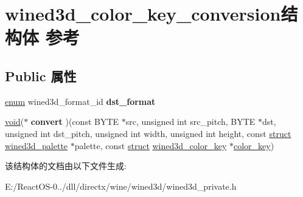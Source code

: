 \hypertarget{structwined3d__color__key__conversion}{}\section{wined3d\+\_\+color\+\_\+key\+\_\+conversion结构体 参考}
\label{structwined3d__color__key__conversion}
\subsection*{Public 属性}
\begin{DoxyCompactItemize}
\item 
\mbox{\label{structwined3d__color__key__conversion_a3f2db482c1bf63bac8eee63b75c5b903}} 
\hyperlink{interfaceenum}{enum} wined3d\+\_\+format\+\_\+id {\bfseries dst\+\_\+format}
\item 
\mbox{\label{structwined3d__color__key__conversion_a1e7419b01166eece309c4b51062fb1e2}} 
\hyperlink{interfacevoid}{void}($\ast$ {\bfseries convert} )(const B\+Y\+TE $\ast$src, unsigned int src\+\_\+pitch, B\+Y\+TE $\ast$dst, unsigned int dst\+\_\+pitch, unsigned int width, unsigned int height, const \hyperlink{interfacestruct}{struct} \hyperlink{structwined3d__palette}{wined3d\+\_\+palette} $\ast$palette, const \hyperlink{interfacestruct}{struct} \hyperlink{structwined3d__color__key}{wined3d\+\_\+color\+\_\+key} $\ast$\hyperlink{structcolor__key}{color\+\_\+key})
\end{DoxyCompactItemize}


该结构体的文档由以下文件生成\+:\begin{DoxyCompactItemize}
\item 
E\+:/\+React\+O\+S-\/0../dll/directx/wine/wined3d/wined3d\+\_\+private.\+h\end{DoxyCompactItemize}
